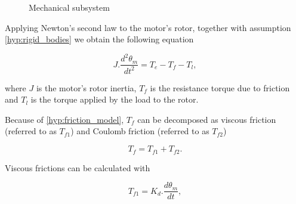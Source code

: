 \documentclass{article}
\begin{document}
    \begin{figure}[H]
        \center
        \caption{Mechanical subsystem}
        \label{fig:mechanical_subsys}
    \end{figure}

    Applying Newton's second law to the motor's rotor, together with assumption \ref{hyp:rigid_bodies} we obtain the following equation

    \begin{equation}
        J.\frac{d^2\theta_m}{dt^2}=T_e-T_f-T_l,
        \label{eq:newtons_law_at_shaft}
    \end{equation}

    where $J$ is the motor's rotor inertia, $T_f$ is the resistance torque due to friction and $T_l$ is the torque applied by the load to the rotor.

    Because of \ref{hyp:friction_model}, $T_f$ can be decomposed as viscous friction (referred to as $T_{f1}$) and Coulomb friction (referred to as $T_{f2}$)

    \begin{equation}
        T_f = T_{f1} + T_{f2}.
    \end{equation}

    Viscous frictions can be calculated with

    \begin{equation}
        T_{f1} = K_d.\frac{d\theta_m}{dt},
    \end{equation}
\end{document}
